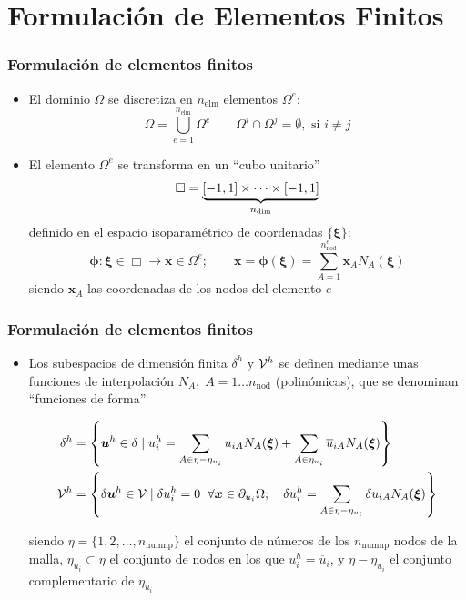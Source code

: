 \documentclass{beamer}
\begin{document}
\section{Formulación de Elementos Finitos}
\begin{frame}
\frametitle{Formulación de elementos finitos}
\begin{itemize}
\item El dominio $\Omega$ se discretiza en $n_{\textrm{elm}}$ elementos
$\Omega^e$:
\begin{equation}
\Omega=\bigcup_{e=1}^{n_{\textrm{elm}}} \Omega^e \qquad \Omega^i \cap \Omega^j=
\emptyset,\textrm{ si } i\neq j
\end{equation}
\item El elemento $\Omega^e$ se transforma
en un ``cubo unitario''
$$\Box=\underbrace{[-1,1]\times \cdots \times [-1,1]}_{n_{\rm dim}}$$
definido en el espacio isoparamétrico de coordenadas $\{ \bm{\xi} \}$:
\begin{equation}
\bm{\phi}:\bm{\xi}\in \Box \rightarrow \bm{x} \in \Omega^e; \qquad
\bm{x}=\bm{\phi}(\bm{\xi})=\sum_{A=1}^{n^{e}_{\textrm{nod}}}
\bm{x}_{A} N_{A}(\bm{\xi}) \label{mapiso}
\end{equation}
siendo $\bm{x}_A$ las coordenadas de los nodos
del elemento $e$
\end{itemize}
\end{frame}
\begin{frame}
\frametitle{Formulación de elementos finitos}
\begin{itemize}
\item Los subespacios de dimensión finita $\delta^h$ y ${\cal V}^h$
se definen mediante unas funciones de interpolación $N_A, \;
A=1 \ldots n_{\textrm{nod}}$ (polinómicas), que se denominan ``funciones de forma''
\begin{small}
\begin{align*}
\delta^h&=\left\{
\bm{u}^{h} \in \delta \mid
u_i^{h}=\sum_{A\in \eta - \eta_{u_i}} u_{iA}N_{A}(\bm{\xi})+
\sum_{A \in \eta_{u_i}} \overline{u}_{iA}N_{A}(\bm{\xi})
\right\}  \\
{\cal V}^{h}&=\left\{
\delta \bm{u}^{h} \in {\cal V} \mid \delta u_i^{h}=0 \;\;
\forall \bm{x} \in \partial_{u_i} \Omega ; \quad
\delta u_i^{h}=\sum_{A\in \eta - \eta_{u_i}}
\delta u_{iA}N_{A}(\bm{\xi})
\right\}
\end{align*}
\end{small}
siendo $\eta=\{ 1,2,\ldots,n_{\textrm{numnp}} \}$ el conjunto de números de los
$n_{\textrm{numnp}}$ nodos de la malla, $\eta_{u_i} \subset \eta$ el conjunto
de nodos en los que $u_i^h=\overline{u}_i$, y $\eta - \eta_{u_i}$ el conjunto
complementario de $\eta_{u_i}$
\end{itemize}
\end{frame}
\end{document}
